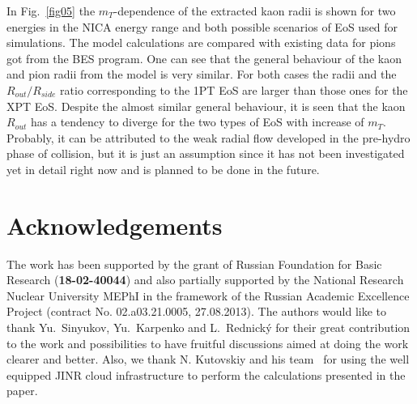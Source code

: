 \documentclass[a4paper]{panl}
\begin{document}
In Fig.~\ref{fig05} the $m_{T}$-dependence of the extracted kaon radii is shown for two energies in the NICA energy range and both possible scenarios of EoS used for simulations.
The model calculations are compared with existing data for pions got from the BES program.
One can see that the general behaviour of the kaon and pion radii from the model is very similar. For both cases the radii and the $R_{out} / R_{side}$ ratio corresponding
to the 1PT EoS are larger than those ones for the XPT EoS. Despite the almost similar general behaviour, it is seen that
the kaon $R_{out}$ has a tendency to diverge for the two types of EoS with increase of $m_{T}$. Probably, it can be attributed to the weak radial flow developed in the pre-hydro phase of
collision, but it is just an assumption since it has not been investigated yet in detail right now and is planned to be done in the future. 
  
\label{sec:Acknowledgements}
\section*{Acknowledgements}
The work has been supported by the grant of Russian Foundation for Basic Research ({\bf 18-02-40044}) and also partially supported
by the National Research Nuclear University MEPhI in the framework of the Russian Academic Excellence Project 
(contract No. 02.a03.21.0005, 27.08.2013).
The authors would like to thank Yu.~Sinyukov, Yu.~Karpenko and L.~Rednick\'{y} for their great contribution to the work and 
possibilities to have fruitful discussions aimed at doing the work clearer and better.
Also, we thank N. Kutovskiy and his team~\cite{jinrCloud} for using the well equipped JINR cloud infrastructure to perform 
the calculations presented in the paper.
\end{document}
